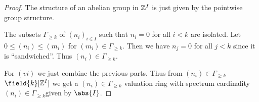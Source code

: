 \begin{proof}
  The structure of an abelian group in $\mathbb{Z}^I$ is just given by
  the pointwise group structure.

  The subsets $\Gamma_{\geq k}$ of $(n_i)_{i\in I}$ such that $n_i=0$
  for all $i<k$ are isolated.
  Let $0 \leq (n_i) \leq (m_i)$ for $(m_i)\in \Gamma_{\geq k}$. Then
  we have $n_j = 0$ for all $j<k$ since it is ``sandwiched''. Thus
  $(n_i)\in \Gamma_{\geq k}$.

  \vspace{\baselineskip}

  For $(vi)$ we just combine the previous parts. Thus from
  $(n_i)\in \Gamma_{\geq k}$$\field{k}[\integers^I]$ we get a
  $(n_i)\in \Gamma_{\geq k}$ valuation ring with spectrum cardinality
  $(n_i)\in \Gamma_{\geq k}$given by $\abs{I}$. 
  
\end{proof}

